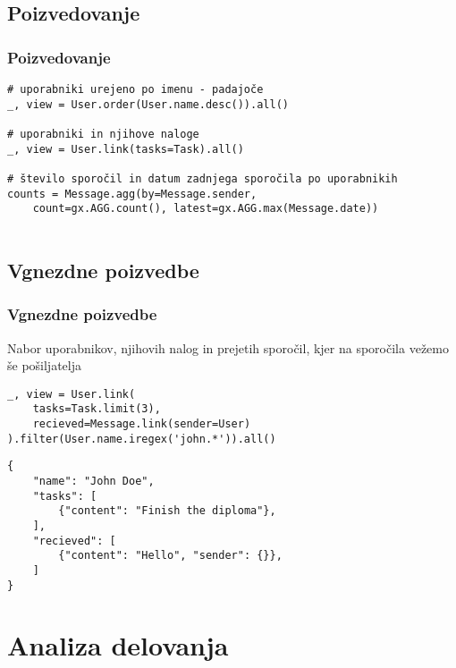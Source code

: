 \documentclass{beamer}
\begin{document}
    \subsection{Poizvedovanje}
    \begin{frame}[fragile]
    \frametitle{Poizvedovanje}
    \footnotesize
    \begin{verbatim}
# uporabniki urejeno po imenu - padajoče
_, view = User.order(User.name.desc()).all()

# uporabniki in njihove naloge
_, view = User.link(tasks=Task).all()

# število sporočil in datum zadnjega sporočila po uporabnikih
counts = Message.agg(by=Message.sender, 
    count=gx.AGG.count(), latest=gx.AGG.max(Message.date))
    
    \end{verbatim}
    \end{frame}

    \subsection{Vgnezdne poizvedbe}
    \begin{frame}[fragile]
    \frametitle{Vgnezdne poizvedbe}
    \begin{block}{Nabor uporabnikov, njihovih nalog in prejetih sporočil, kjer na sporočila vežemo še pošiljatelja}
    \footnotesize
    \begin{verbatim}
_, view = User.link(
    tasks=Task.limit(3), 
    recieved=Message.link(sender=User)
).filter(User.name.iregex('john.*')).all()
        \end{verbatim}
    \end{block}

    \footnotesize
    \begin{verbatim}
{
    "name": "John Doe",
    "tasks": [
        {"content": "Finish the diploma"},
    ],
    "recieved": [
        {"content": "Hello", "sender": {}},
    ]
}
    \end{verbatim}
    \end{frame}
    
\section{Analiza delovanja}
\end{document}
